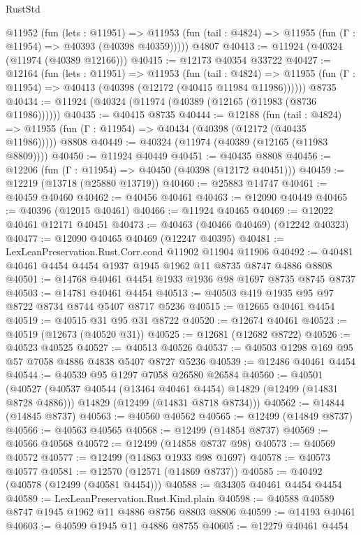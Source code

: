 \begin{lexlean}{RustStd}
\begin{coremodule}
    @11952
      (fun (lets : @11951) =>
      @11953 (fun (tail : @4824) => @11955 (fun (Γ : @11954) => @40393 (@40398 @40359)))))
    @4807
@40413 := @11924 (@40324 (@11974 (@40389 @12166)))
@40415 := @12173 @40354 @33722
@40427 := @12164
    (fun (lets : @11951) =>
    @11953
      (fun (tail : @4824) =>
      @11955 (fun (Γ : @11954) => @40413 (@40398 (@12172 (@40415 @11984 @11986))))))
    @8735
@40434 := @11924 (@40324 (@11974 (@40389 (@12165 (@11983 (@8736 @11986))))))
@40435 := @40415 @8735
@40444 := @12188
    (fun (tail : @4824) => @11955 (fun (Γ : @11954) => @40434 (@40398 (@12172 (@40435 @11986)))))
    @8808
@40449 := @40324 (@11974 (@40389 (@12165 (@11983 @8809))))
@40450 := @11924 @40449
@40451 := @40435 @8808
@40456 := @12206 (fun (Γ : @11954) => @40450 (@40398 (@12172 @40451)))
@40459 := @12219 (@13718 (@25880 @13719))
@40460 := @25883 @14747
@40461 := @40459 @40460
@40462 := @40456 @40461
@40463 := @12090 @40449
@40465 := @40396 (@12015 @40461)
@40466 := @11924 @40465
@40469 := @12022 @40461 @12171 @40451
@40473 := @40463 (@40466 @40469) (@12242 @40323)
@40477 := @12090 @40465 @40469 (@12247 @40395)
@40481 := LexLeanPreservation.Rust.Corr.cond @11902 @11904 @11906
@40492 := @40481 @40461 @4454 @4454 @1937 @1945 @1962 @11 @8735 @8747 @4886 @8808
@40501 := @14768 @40461 @4454 @1933 @1936 @98 @1697 @8735 @8745 @8737
@40503 := @14781 @40461 @4454
@40513 := @40503 @419 @1935 @95 @97 @8722 @8734 @8744 @5407 @8717 @5236
@40515 := @12665 @40461 @4454
@40519 := @40515 @31 @95 @31 @8722
@40520 := @12674 @40461
@40523 := @40519 (@12673 (@40520 @31))
@40525 := @12681 (@12682 @8722)
@40526 := @40523 @40525
@40527 := @40513 @40526
@40537 := @40503 @1298 @169 @95 @57 @7058 @4886 @4838 @5407 @8727 @5236
@40539 := @12486 @40461 @4454
@40544 := @40539 @95 @1297 @7058 @26580 @26584
@40560 := @40501
    (@40527
      (@40537 @40544 (@13464 @40461 @4454) @14829 (@12499 (@14831 @8728 @4886)))
      @14829
      (@12499 (@14831 @8718 @8734)))
@40562 := @14844 (@14845 @8737)
@40563 := @40560 @40562
@40565 := @12499 (@14849 @8737)
@40566 := @40563 @40565
@40568 := @12499 (@14854 @8737)
@40569 := @40566 @40568
@40572 := @12499 (@14858 @8737 @98)
@40573 := @40569 @40572
@40577 := @12499 (@14863 @1933 @98 @1697)
@40578 := @40573 @40577
@40581 := @12570 (@12571 (@14869 @8737))
@40585 := @40492 (@40578 (@12499 (@40581 @4454)))
@40588 := @34305 @40461 @4454 @4454
@40589 := LexLeanPreservation.Rust.Kind.plain
@40598 := @40588 @40589 @8747 @1945 @1962 @11 @4886 @8756 @8803 @8806
@40599 := @14193 @40461
@40603 := @40599 @1945 @11 @4886 @8755
@40605 := @12279 @40461 @4454

\end{coremodule}
\end{lexlean}

